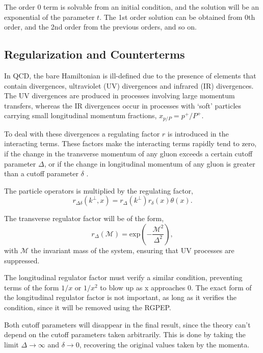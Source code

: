 \documentclass[11pt,a4paper,twoside,pdf]{article}
\numberwithin{equation}{section}
\begin{document}
The order 0 term is solvable from an initial condition, and the solution will be an 
exponential of the parameter $t$. The 1st order solution can be obtained from 0th 
order, and the 2nd order from the previous orders, and so on. 

\newpage

\subsection{Regularization and Counterterms}\label{sec:regulatrization_countertems}

In QCD, the bare Hamiltonian is ill-defined due to the presence of elements 
that contain divergences\cite{QCDG,glazek_renormalization_1993}, ultraviolet (UV) divergences and infrared (IR) divergences.
The UV divergences are produced in processes involving large momentum transfers, 
whereas the IR divergences occur in processes with ‘soft’ particles carrying small 
longitudinal momentum fractions, $x_{p/P} = p^+/P^+$.

To deal with these divergences a regulating factor $r$ is 
introduced in the interacting terms. These factors make the interacting terms rapidly 
tend to zero, if the change in the transverse momentum of any gluon exceeds a certain
cutoff parameter $\Delta$, or if the change in longitudinal momentum of any gluon is
greater than a cutoff parameter $\delta$ \cite{Collins_1984}. 

The particle operators is multiplied by the regulating factor, 
\begin{equation}
    r_{\Delta \delta} (k^\perp, x) = r_\Delta (k^\perp) r_\delta(x) \theta(x).
\end{equation}

The transverse regulator factor will be of the form, 
\begin{equation}
    r_\Delta (\mathcal{M}) = \text{exp} \left( -\frac{\mathcal{M}^2}{\Delta^2} \right),
\end{equation}
with $\mathcal{M}$ the invariant mass of the system, ensuring that UV processes are
suppressed.

The longitudinal regulator factor must verify a similar condition, preventing terms
of the form $1/x$ or $1/x^2$ to blow up as x approaches 0. The exact form of the 
longitudinal regulator factor is not important, as long as it verifies the condition, 
since it will be removed using the RGPEP.

Both cutoff parameters will disappear in the final result, since the theory can't
depend on the cutoff parameters taken arbitrarily. This is done by taking the
limit $\Delta \to \infty$ and $\delta \to 0$, recovering the original values
taken by the momenta.
\end{document}

